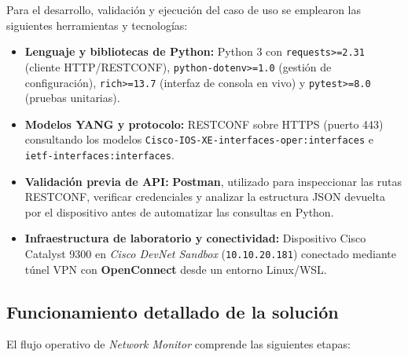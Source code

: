 \documentclass[12pt,a4paper]{article}
\begin{document}
Para el desarrollo, validación y ejecución del caso de uso se emplearon las siguientes herramientas y tecnologías:

\begin{itemize}
    \item \textbf{Lenguaje y bibliotecas de Python:} Python 3 con \texttt{requests>=2.31} (cliente HTTP/RESTCONF), \texttt{python-dotenv>=1.0} (gestión de configuración), \texttt{rich>=13.7} (interfaz de consola en vivo) y \texttt{pytest>=8.0} (pruebas unitarias).
    \item \textbf{Modelos YANG y protocolo:} RESTCONF sobre HTTPS (puerto 443) consultando los modelos \texttt{Cisco-IOS-XE-interfaces-oper:interfaces} e \texttt{ietf-interfaces:interfaces}.
    \item \textbf{Validación previa de API:} \textbf{Postman}, utilizado para inspeccionar las rutas RESTCONF, verificar credenciales y analizar la estructura JSON devuelta por el dispositivo antes de automatizar las consultas en Python.
    \item \textbf{Infraestructura de laboratorio y conectividad:} Dispositivo Cisco Catalyst 9300 en \textit{Cisco DevNet Sandbox} (\texttt{10.10.20.181}) conectado mediante túnel VPN con \textbf{OpenConnect} desde un entorno Linux/WSL.
\end{itemize}

\subsection{Funcionamiento detallado de la solución}

El flujo operativo de \textit{Network Monitor} comprende las siguientes etapas:
\end{document}
